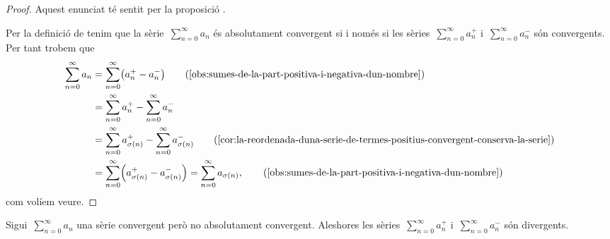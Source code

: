 \documentclass[../../main.tex]{subfiles}
\begin{document}
    \begin{proof}
        Aquest enunciat té sentit per la proposició .

        Per la definició de  tenim que la sèrie~\(\sum_{n=0}^{\infty}a_{n}\) és absolutament convergent si i només si les sèries~\(\sum_{n=0}^{\infty}a^{+}_{n}\) i~\(\sum_{n=0}^{\infty}a^{-}_{n}\) són convergents.
        Per tant trobem que
        \begin{align*}
            \sum_{n=0}^{\infty}a_{n}&=\sum_{n=0}^{\infty}\left(a^{+}_{n}-a^{-}_{n}\right) \tag{\ref{obs:sumes-de-la-part-positiva-i-negativa-dun-nombre}}\\
            &=\sum_{n=0}^{\infty}a^{+}_{n}-\sum_{n=0}^{\infty}a^{-}_{n} \\
            &=\sum_{n=0}^{\infty}a^{+}_{\sigma(n)}-\sum_{n=0}^{\infty}a^{-}_{\sigma(n)} \tag{\ref{cor:la-reordenada-duna-serie-de-termes-positius-convergent-conserva-la-serie}}\\
            &=\sum_{n=0}^{\infty}\left(a^{+}_{\sigma(n)}-a^{-}_{\sigma(n)}\right)=\sum_{n=0}^{\infty}a_{\sigma(n)}, \tag{\ref{obs:sumes-de-la-part-positiva-i-negativa-dun-nombre}}
        \end{align*}
        com volíem veure.
    \end{proof}
    \begin{lemma}
        \label{lema:Teorema-de-la-reordenacio-de-series-de-Riemann}
        Sigui~\(\sum_{n=0}^{\infty}a_{n}\) una sèrie convergent però no absolutament convergent.
        Aleshores les sèries~\(\sum_{n=0}^{\infty}a^{+}_{n}\) i~\(\sum_{n=0}^{\infty}a^{-}_{n}\) són divergents.
    \end{lemma}
\end{document}
